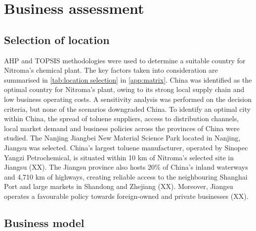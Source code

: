 \section{Business assessment}
\label{sec:economics}
\subsection{Selection of location} 
AHP and TOPSIS methodologies were used to determine a suitable country for Nitroma’s chemical plant. The key factors taken into consideration are summarised in \cref{tab:location selection} in \cref{app:matrix}. China was identified as the optimal country for Nitroma's plant, owing to its strong local supply chain and low business operating costs. A sensitivity analysis was performed on the decision criteria, but none of the scenarios downgraded China. To identify an optimal city within China, the spread of toluene suppliers, access to distribution channels, local market demand and business policies across the provinces of China were studied. The Nanjing Jiangbei New Material Science Park located in Nanjing, Jiangsu was selected. China’s largest toluene manufacturer, operated by Sinopec Yangzi Petrochemical, is situated within 10 km of Nitroma’s selected site in Jiangsu (XX). The Jiangsu province also hosts 20\% of China’s inland waterways and 4,710 km of highways, creating reliable access to the neighbouring Shanghai Port and large markets in Shandong and Zhejiang (XX). Moreover, Jiangsu operates a favourable policy towards foreign-owned and private businesses (XX). 

\subsection{Business model} 
